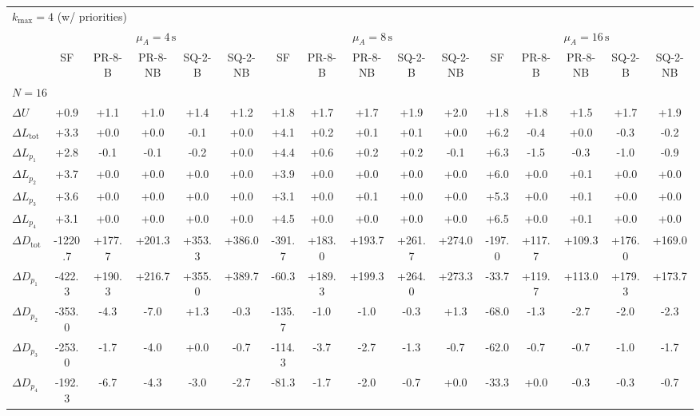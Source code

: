 \begin{tabular}{l c c c c c c c c c c c c c c c}
\toprule
\multicolumn{16}{l}{$k_{\max}=4$ (w/ priorities)} \\
\addlinespace[0.2em]
 & \multicolumn{5}{c}{$\mu_A=4\,\mathrm{s}$} & \multicolumn{5}{c}{$\mu_A=8\,\mathrm{s}$} & \multicolumn{5}{c}{$\mu_A=16\,\mathrm{s}$} \\
\cmidrule(lr){2-6}\cmidrule(lr){7-11}\cmidrule(lr){12-16}
 & SF & PR-8-B & PR-8-NB & SQ-2-B & SQ-2-NB & SF & PR-8-B & PR-8-NB & SQ-2-B & SQ-2-NB & SF & PR-8-B & PR-8-NB & SQ-2-B & SQ-2-NB \\
\midrule
\multicolumn{16}{l}{${N=16}$} \\
\midrule
$\Delta U$ & +0.9 & +1.1 & +1.0 & +1.4 & +1.2 & +1.8 & +1.7 & +1.7 & +1.9 & +2.0 & +1.8 & +1.8 & +1.5 & +1.7 & +1.9 \\
$\Delta L_{\mathrm{tot}}$ & +3.3 & +0.0 & +0.0 & -0.1 & +0.0 & +4.1 & +0.2 & +0.1 & +0.1 & +0.0 & +6.2 & -0.4 & +0.0 & -0.3 & -0.2 \\
$\Delta L_{p_1}$ & +2.8 & -0.1 & -0.1 & -0.2 & +0.0 & +4.4 & +0.6 & +0.2 & +0.2 & -0.1 & +6.3 & -1.5 & -0.3 & -1.0 & -0.9 \\
$\Delta L_{p_2}$ & +3.7 & +0.0 & +0.0 & +0.0 & +0.0 & +3.9 & +0.0 & +0.0 & +0.0 & +0.0 & +6.0 & +0.0 & +0.1 & +0.0 & +0.0 \\
$\Delta L_{p_3}$ & +3.6 & +0.0 & +0.0 & +0.0 & +0.0 & +3.1 & +0.0 & +0.1 & +0.0 & +0.0 & +5.3 & +0.0 & +0.1 & +0.0 & +0.0 \\
$\Delta L_{p_4}$ & +3.1 & +0.0 & +0.0 & +0.0 & +0.0 & +4.5 & +0.0 & +0.0 & +0.0 & +0.0 & +6.5 & +0.0 & +0.1 & +0.0 & +0.0 \\
$\Delta D_{\mathrm{tot}}$ & -1220.7 & +177.7 & +201.3 & +353.3 & +386.0 & -391.7 & +183.0 & +193.7 & +261.7 & +274.0 & -197.0 & +117.7 & +109.3 & +176.0 & +169.0 \\
$\Delta D_{p_1}$ & -422.3 & +190.3 & +216.7 & +355.0 & +389.7 & -60.3 & +189.3 & +199.3 & +264.0 & +273.3 & -33.7 & +119.7 & +113.0 & +179.3 & +173.7 \\
$\Delta D_{p_2}$ & -353.0 & -4.3 & -7.0 & +1.3 & -0.3 & -135.7 & -1.0 & -1.0 & -0.3 & +1.3 & -68.0 & -1.3 & -2.7 & -2.0 & -2.3 \\
$\Delta D_{p_3}$ & -253.0 & -1.7 & -4.0 & +0.0 & -0.7 & -114.3 & -3.7 & -2.7 & -1.3 & -0.7 & -62.0 & -0.7 & -0.7 & -1.0 & -1.7 \\
$\Delta D_{p_4}$ & -192.3 & -6.7 & -4.3 & -3.0 & -2.7 & -81.3 & -1.7 & -2.0 & -0.7 & +0.0 & -33.3 & +0.0 & -0.3 & -0.3 & -0.7 \\

\end{tabular}
